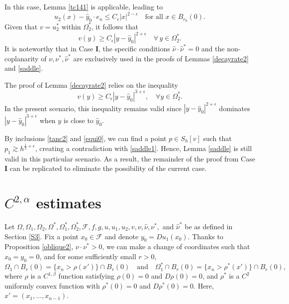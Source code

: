 \documentclass[11pt]{amsart}
\theoremstyle{plain}
\newcommand{\0}{\textbf{0}}
\numberwithin{equation}{section}
\numberwithin{equation}{section}
\numberwithin{figure}{section}
\begin{document}
In this case, Lemma \ref{tc141} is applicable, leading to
\begin{equation*}
u_2(x)-\hat y_0\cdot e_n \leq C_\epsilon |x|^{2-\epsilon} \quad\text{for all } x \in B_{r_0}(0).
\end{equation*}
Given that \(v = u_2^*\) within \(\Omega_2^*\), it follows that
\begin{equation*}
v(y) \geq C_\epsilon |y - \hat y_0|^{2+\epsilon} \quad \forall\, y \in \Omega^*_2.
\end{equation*}
It is noteworthy that in Case \textbf{I}, the specific conditions \(\hat\nu \cdot \hat\nu^* = 0\) and the non-coplanarity of \(\nu, \nu^*, \hat\nu^*\) are exclusively used in the proofs of Lemmas \ref{decayrate2} and \ref{saddle}. 

The proof of Lemma \ref{decayrate2} relies on the inequality
\begin{equation*}
v(y) \geq C_\epsilon |y - \hat y_0|^{3+\epsilon}, \quad \forall y \in \Omega_2^*.
\end{equation*}
In the present scenario, this inequality remains valid since \(|y - \hat y_0|^{2+\epsilon}\) dominates \(|y - \hat y_0|^{3+\epsilon}\) when \(y\) is close to \(\hat y_0\).

By inclusions \eqref{tanc2} and \eqref{equi0}, we can find a point \(p \in S_h[v]\)  such that \(p_1 \gtrsim h^{\frac{1}{2} + \epsilon}\), creating a contradiction with \eqref{saddle1}. Hence, Lemma \ref{saddle} is still valid in this particular scenario. As a result, the remainder of the proof from Case \textbf{I} can be replicated to eliminate the possibility of the current case.







\section{$C^{2,\alpha}$ estimates}
\label {S5}
Let \( \Omega, \Omega_1, \Omega_2, \Omega^*, \Omega^*_1, \Omega^*_2, \mathcal{F}, f, g, u, u_1, u_2, v, \nu, \hat\nu, \nu^*, \) and \( \hat\nu^* \) be as defined in Section \ref{S3}. Fix a point \( x_0 \in \mathcal{F} \) and denote \( y_0 = Du_1(x_0) \). 
Thanks to Proposition \ref{oblique2}, \( \nu \cdot \nu^* > 0 \), we can make a change of coordinates such that \( x_0 = y_0 = 0 \), and for some sufficiently small \( r > 0 \), 
\[
\Omega_1 \cap B_r(0) = \{x_n > \rho(x')\} \cap B_r(0) \quad \text{and} \quad \Omega_1^* \cap B_r(0) = \{x_n > \rho^*(x')\} \cap B_r(0),
\]
where \( \rho \) is a \( C^{1,\beta} \) function satisfying \( \rho(0) = 0 \) and \( D\rho(0) = 0 \), and \( \rho^* \) is a \( C^2 \) uniformly convex function with \( \rho^*(0) = 0 \) and \( D\rho^*(0) = 0 \). Here, \( x' = (x_1, \ldots, x_{n-1}) \).
\end{document}
